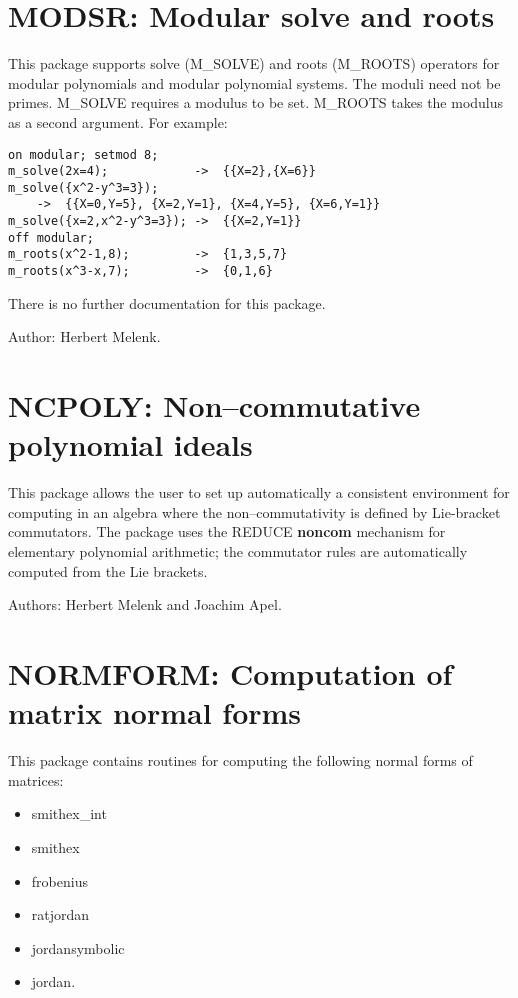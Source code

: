 
\newpage

\section{MODSR: Modular solve and roots} 

This package supports solve (M\_SOLVE) and roots (M\_ROOTS) operators for
modular polynomials and modular polynomial systems.  The moduli need not
be primes. M\_SOLVE requires a modulus to be set.  M\_ROOTS takes the
modulus as a second argument. For example:

\begin{verbatim}
on modular; setmod 8;
m_solve(2x=4);            ->  {{X=2},{X=6}}
m_solve({x^2-y^3=3});
    ->  {{X=0,Y=5}, {X=2,Y=1}, {X=4,Y=5}, {X=6,Y=1}}
m_solve({x=2,x^2-y^3=3}); ->  {{X=2,Y=1}}
off modular;
m_roots(x^2-1,8);         ->  {1,3,5,7}
m_roots(x^3-x,7);         ->  {0,1,6}
\end{verbatim}

There is no further documentation for this package.

Author: Herbert Melenk.

\newpage

\section{NCPOLY: Non--commutative polynomial ideals}

This package allows the user to set up automatically a consistent
environment for computing in an algebra where the non--commutativity is
defined by Lie-bracket commutators.  The package uses the {REDUCE} {\bf
noncom} mechanism for elementary polynomial arithmetic; the commutator
rules are automatically computed from the Lie brackets.

Authors: Herbert Melenk and Joachim Apel.


\newpage

\section{NORMFORM: Computation of matrix normal forms} 
\label{NORMFORM}

This package contains routines for computing the following
normal forms of matrices:
\begin{itemize}
\item smithex\_int
\item smithex
\item frobenius
\item ratjordan
\item jordansymbolic
\item jordan.
\end{itemize}

